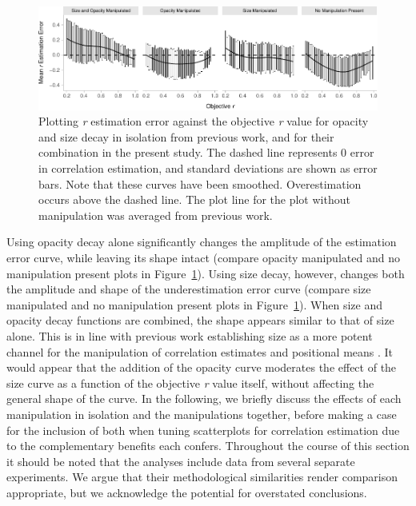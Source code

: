 \documentclass[manuscript, review, anonymous, screen]{acmart}
\begin{document}
\begin{figure}

{\centering \includegraphics[width=1\textwidth,height=\textheight]{size_and_opacity_files/figure-pdf/fig-est-multi-exp-1.pdf}

}

\caption{\label{fig-est-multi-exp}Plotting \emph{r} estimation error
against the objective \emph{r} value for opacity and size decay in
isolation from previous work, and for their combination in the present
study. The dashed line represents 0 error in correlation estimation, and
standard deviations are shown as error bars. Note that these curves have
been smoothed. Overestimation occurs above the dashed line. The plot
line for the plot without manipulation was averaged from previous work.}

\end{figure}

Using opacity decay alone significantly changes the amplitude of the
estimation error curve, while leaving its shape intact (compare opacity
manipulated and no manipulation present plots in
Figure~\ref{fig-est-multi-exp}). Using size decay, however, changes both
the amplitude and shape of the underestimation error curve (compare size
manipulated and no manipulation present plots in
Figure~\ref{fig-est-multi-exp}). When size and opacity decay functions
are combined, the shape appears similar to that of size alone. This is
in line with previous work establishing size as a more potent channel
for the manipulation of correlation estimates \citep{strain_2023b} and
positional means \citep{hong_2021}. It would appear that the addition of
the opacity curve moderates the effect of the size curve as a function
of the objective \emph{r} value itself, without affecting the general
shape of the curve. In the following, we briefly discuss the effects of
each manipulation in isolation and the manipulations together, before
making a case for the inclusion of both when tuning scatterplots for
correlation estimation due to the complementary benefits each confers.
Throughout the course of this section it should be noted that the
analyses include data from several separate experiments. We argue that
their methodological similarities render comparison appropriate, but we
acknowledge the potential for overstated conclusions.
\end{document}
